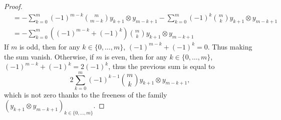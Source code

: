 \documentclass[11pt, a4paper]{amsart}
\numberwithin{equation}{section}
\theoremstyle{definition}
\begin{document}
\begin{proof}
\begin{align*}
        & = - \sum_{k=0}^{m} (-1)^{m-k} \binom{m}{m-k} y_{k+1} \otimes y_{m-k+1} - \sum_{k=0}^{m} (-1)^{k} \binom{m}{k} y_{k+1} \otimes y_{m-k+1} \\
        & = - \sum_{k=0}^{m} \left((-1)^{m-k} + (-1)^k\right) \binom{m}{k} y_{k+1} \otimes y_{m-k+1}
    \end{align*}
    If $m$ is odd, then for any $k \in \{0, \dots, m\}$, $(-1)^{m-k} + (-1)^k = 0$. Thus making the sum vanish. Otherwise, if $m$ is even, then for any $k \in \{0, \dots, m\}$, $(-1)^{m-k} + (-1)^k = 2 (-1)^k$, thus the previous sum is equal to
    \[
        2 \sum_{k=0}^{m}  (-1)^{k-1} \binom{m}{k} y_{k+1} \otimes y_{m-k+1},
    \]
    which is not zero thanks to the freeness of the family $\left(y_{k+1} \otimes y_{m-k+1}\right)_{k \in \{0, \dots, m\}}$.
\end{proof}
\end{document}
